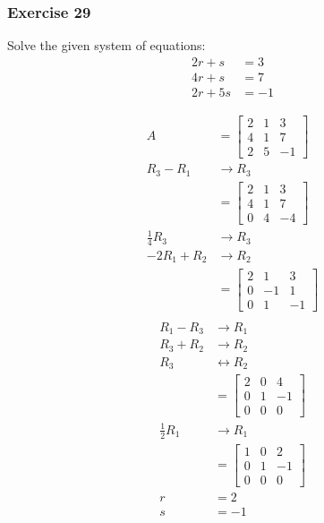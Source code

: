 \documentclass[letterpaper, 12pt]{math}
\begin{document}
\subsubsection*{Exercise 29}
Solve the given system of equations:
\begin{align*}
  2r+s &= 3 \\
  4r+s &= 7 \\
  2r+5s &= -1
\end{align*}
\begin{multicols}{2}
  \begin{align*}
    A &= \begin{bmatrix}
      2 & 1 & 3 \\
      4 & 1 & 7 \\
      2 & 5 & -1
    \end{bmatrix} \\
    R_3-R_1 &\to R_3 \\
    &= \begin{bmatrix}
      2 & 1 & 3 \\
      4 & 1 & 7 \\
      0 & 4 & -4
    \end{bmatrix} \\
    \frac{1}{4}R_3 &\to R_3 \\
    -2R_1+R_2 &\to R_2 \\
    &= \begin{bmatrix}
      2 & 1 & 3 \\
      0 & -1 & 1 \\
      0 & 1 & -1
    \end{bmatrix} \\
  \end{align*}
  \begin{align*}
    R_1-R_3 &\to R_1 \\
    R_3+R_2 &\to R_2 \\
    R_3 &\leftrightarrow R_2 \\
    &= \begin{bmatrix}
      2 & 0 & 4 \\
      0 & 1 & -1 \\
      0 & 0 & 0
    \end{bmatrix} \\
    \frac{1}{2}R_1 &\to R_1 \\
    &= \begin{bmatrix}
      1 & 0 & 2 \\
      0 & 1 & -1 \\
      0 & 0 & 0
    \end{bmatrix} \\
    r &= 2 \\
    s &= -1
  \end{align*}
\end{multicols}
\end{document}
